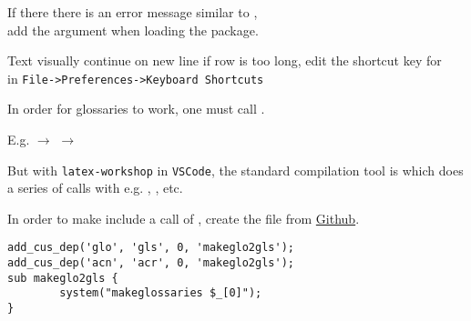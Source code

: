 If there there is an error message similar to ,\\
add the argument  when loading the  package. 



Text visually continue on new line if row is too long, edit the shortcut key for\\ in \texttt{File->Preferences->Keyboard Shortcuts}


In order for glossaries to work, one must call .

E.g.   \(\rightarrow\)  \(\rightarrow\) 

But with \texttt{latex-workshop} in \texttt{VSCode}, the standard compilation tool is  which does a series of calls with e.g. , , etc.

In order to make  include a call of , create the file  from \href{https://github.com/robinhellmers/computer_setup}{Github}.

\begin{verbatim}
add_cus_dep('glo', 'gls', 0, 'makeglo2gls');
add_cus_dep('acn', 'acr', 0, 'makeglo2gls');
sub makeglo2gls {
        system("makeglossaries $_[0]");
}
\end{verbatim}